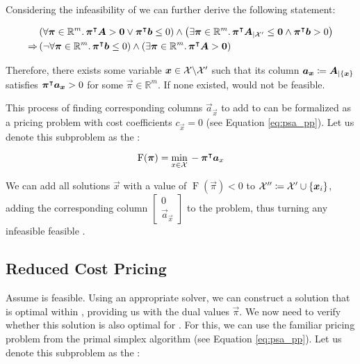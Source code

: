 Considering the infeasibility of \RMP{} we can further derive the following statement:

\begin{equation}
\begin{aligned}
& \left( \forall {\bm{\pi}} \in \mathbb{R}^m. \, {\bm{\pi}}^\intercal {\bm{A}} > {\bm{0}} \lor {\bm{\pi}}^\intercal {\bm{b}} \leq 0 \right) \land \left( \exists {\bm{\pi}} \in \mathbb{R}^m. \, {\bm{\pi}}^\intercal {\bm{A}}_{\vert \mathcal{X}'} \leq {\bm{0}} \land {\bm{\pi}}^\intercal {\bm{b}} > 0 \right) \\
\Rightarrow & \left( \neg \forall {\bm{\pi}} \in \mathbb{R}^m. \, {\bm{\pi}}^\intercal {\bm{b}} \leq 0 \right) \land \left( \exists {\bm{\pi}} \in \mathbb{R}^m. \, {\bm{\pi}}^\intercal {\bm{A}} > {\bm{0}} \right)
\end{aligned}
\end{equation}

Therefore, there exists some variable ${\bm{x}} \in \mathcal{X} \backslash \mathcal{X}'$ such that its column ${\bm{a}}_{\bm{x}} \coloneqq {\bm{A}}_{\vert \{{\bm{x}}\}}$ satisfies ${\bm{\pi}}^\intercal {\bm{a}}_{\bm{x}} > 0$ for some $\vec{\pi} \in \mathbb{R}^m$. If none existed, \MP{} would not be feasible.

This process of finding corresponding columns $\vec{a}_\vec{x}$ to add to \RMP{} can be formalized as a pricing problem with cost coefficients $c_\vec{x} = 0$ (see Equation \eqref{eq:psa_pp}). Let us denote this subproblem as the \FP{}:

\begin{equation}
\operatorname{F}({\bm{\pi}}) = \underset{x \in \mathcal{X}}{\min} \, -{\bm{\pi}}^\intercal {\bm{a}}_x
\end{equation}

We can add all solutions $\vec{x}$ with a value of $\operatorname{F}(\vec{\pi}) < 0$ to $\mathcal{X}'' \coloneqq \mathcal{X}' \cup \{{\bm{x}}_i\}$, adding the corresponding column $\begin{bmatrix}0 \\ \vec{a}_\vec{x} \end{bmatrix}$ to the problem, thus turning any infeasible \RMP{} feasible \cite{thebook}.

\subsection{Reduced Cost Pricing \RCP{}}\label{sec:cg_bp_cg_reduced}
Assume \RMP{} is feasible. Using an appropriate solver, we can construct a solution that is optimal within \RMP{}, providing us with the dual values $\vec{\pi}$. We now need to verify whether this solution is also optimal for \MP{}. For this, we can use the familiar pricing problem from the primal simplex algorithm (see Equation \eqref{eq:psa_pp}). Let us denote this subproblem as the \RCP{}:

